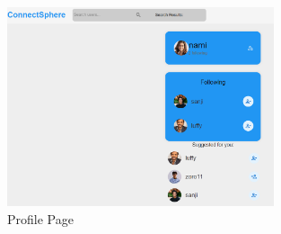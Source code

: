 \begin{figure}[h!]
    \centering
    \includegraphics[width=0.7\textwidth]{images/profile.PNG}
    \caption{Profile Page}
    \label{fig:profile}
\end{figure}